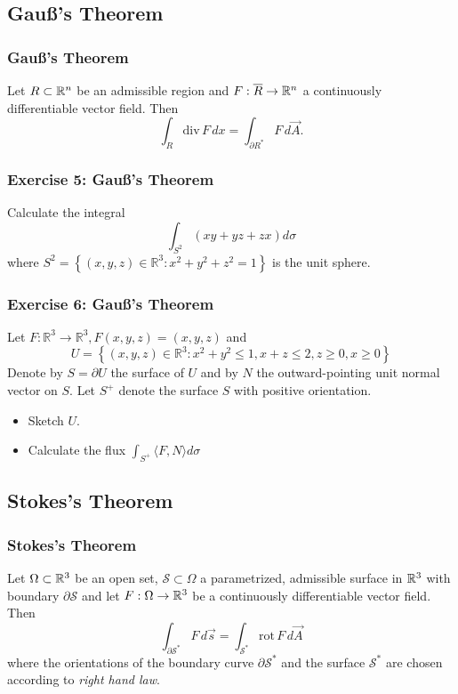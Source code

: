 \documentclass[11pt, t]{beamer}
\renewcommand{\emph}[1]{{\color{Turquoise3}\textsl{#1}}}
\begin{document}
\subsection{Gau\ss's Theorem}
\begin{frame}
    \frametitle{Gau\ss's Theorem}
    Let $R\subset\mathbb{R}^n$ be an admissible region and $F:\overline{R}\to\mathbb{R}^n$ a continuously dif{}ferentiable vector field. Then
    \[\int_R\text{div}\,F\,dx=\int_{\partial R^*}F\,d\vec{A}.\]
\end{frame}

\begin{frame}
    \frametitle{Exercise 5: Gau\ss's Theorem}
    Calculate the integral
    \[
        \int_{S^{2}}(x y+y z+z x) d \sigma
    \]
    where $S^{2}=\left\{(x, y, z) \in \mathbb{R}^{3}: x^{2}+y^{2}+z^{2}=1\right\}$ is the unit sphere.
\end{frame}

\begin{frame}
    \frametitle{Exercise 6: Gau\ss's Theorem}
    Let $F: \mathbb{R}^{3} \rightarrow \mathbb{R}^{3}, F(x, y, z)=(x, y, z)$ and
    \[
        U=\left\{(x, y, z) \in \mathbb{R}^{3}: x^{2}+y^{2} \leq 1, x+z \leq 2, z \geq 0, x \geq 0\right\}
    \]
    Denote by $S=\partial U$ the surface of $U$ and by $N$ the outward-pointing unit normal vector on $S .$ Let $S^{+}$ denote the surface $S$ with positive orientation.
    \begin{itemize}
        \item Sketch $U$.
        \item Calculate the flux $\int_{S^{+}}\langle F, N\rangle d \sigma$
    \end{itemize}
\end{frame}




\subsection{Stokes's Theorem}
\begin{frame}
    \frametitle{Stokes's Theorem}
    Let $\Omega\subset\mathbb{R}^3$ be an open set, $\mathcal{S}\subset\Omega$ a parametrized, admissible surface in $\mathbb{R}^3$ with boundary $\partial\mathcal{S}$ and let $F:\Omega\to\mathbb{R}^3$ be a continuously dif{}ferentiable vector field. Then
    \[\int_{\partial\mathcal{S}^*}F\,d\vec{s}=
        \int_{\mathcal{S}^*}\text{rot}\,F\,d\vec{A}\]
    where the orientations of the boundary curve $\partial\mathcal{S}^*$ and the surface $\mathcal{S}^*$ are chosen according to \emph{right hand law}.
\end{frame}
\end{document}
